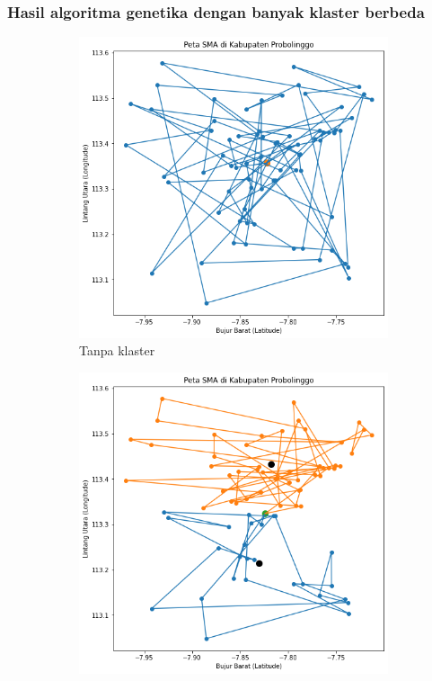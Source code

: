 \begin{frame}
\frametitle{Hasil algoritma genetika dengan banyak klaster berbeda}
	\begin{figure}
	\centering
		\begin{subfigure}[h]{0.2\textwidth}
		\includegraphics[width=\textwidth]{gambar/hasil_mtsp/1}
		\caption{Tanpa klaster}
		\end{subfigure}
		\hfill
		\begin{subfigure}[h]{0.2\textwidth}
		\includegraphics[width=\textwidth]{gambar/hasil_mtsp/2}

\end{subfigure}
\end{figure}
\end{frame}
